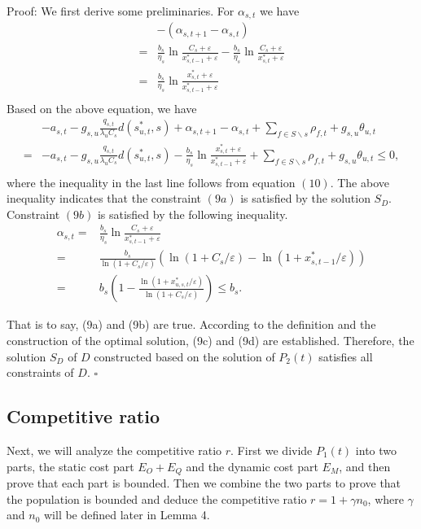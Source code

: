 \documentclass[journal,article,submit,pdftex,moreauthors]{Definitions/mdpi}
\begin{document}
Proof:
We first derive some preliminaries. For $\alpha_{s,t}$ we have\\
\begin{align*}
&-(\alpha_{s,t+1}-\alpha_{s,t})\\
=&\frac{b_s}{\eta_s}\ln \frac{C_s+\varepsilon}{x_{s,t-1}^{*}+\varepsilon}-\frac{b_s}{\eta_s}\ln \frac{C_s+\varepsilon}{x_{s,t}^{*}+\varepsilon}\\
=&\frac{b_s}{\eta_s}\ln \frac{x_{s,t}^{*}+\varepsilon}{x_{s,t-1}^{*}+\varepsilon}\\
\end{align*}
Based on the above equation, we have\\
\begin{align*}
&-a_{s,t}-g_{s,u}\frac{q_{s,t}}{\lambda_u C_s}d(s_{u,t}^{*},s)+\alpha_{s,t+1}-\alpha_{s,t}+\sum_{f \in S\backslash s } \rho_{f,t}+g_{s,u}\theta_{u,t}\\
=&-a_{s,t}-g_{s,u}\frac{q_{s,t}}{\lambda_u C_s}d(s_{u,t}^{*},s)-\frac{b_s}{\eta_s}\ln \frac{x_{s,t}^{*}+\varepsilon}{x_{s,t-1}^{*}+\varepsilon}+\sum_{f\in S \backslash s}\rho_{f,t}+g_{s,u}\theta_{u,t}\le 0,\\
\end{align*}
where the inequality in the last line follows from equation $(10)$. The above inequality indicates that the constraint $(9a)$  is satisfied by the solution $S_D$. Constraint $(9b)$ is satisfied by the following inequality. 
\begin{align*}
\alpha_{s,t}=&\frac{b_s}{\eta_s}\ln \frac{C_s+\varepsilon}{x_{s,t-1}^{*}+\varepsilon}\\
=&\frac{b_s}{\ln (1+C_s / \varepsilon)}(\ln (1+C_s / \varepsilon)- \ln (1+x_{s,t-1}^{*} / \varepsilon))\\
=&b_s(1-\frac{\ln(1+x_{u,s,t}^{*}/ \varepsilon)}{\ln(1+C_s/ \varepsilon)})\le b_s.
\end{align*}

That is to say, (9a)  and (9b) are true.  According to the definition and the construction of the optimal solution, (9c) and (9d) are established.  Therefore, the solution $S_D$ of $D$ constructed based on the solution of $P_2(t)$ satisfies all constraints of $D$. $\square$ 


\subsection{Competitive ratio}

Next, we will analyze the competitive ratio $r$.  First we divide $P_1(t)$ into two parts, the static cost part $E_O+E_Q$ and the dynamic cost part $E_M$, and then prove that each part is bounded. Then we combine the two parts to prove that the population is bounded and deduce the competitive ratio $r=1+\gamma n_0 $, where $\gamma$ and $n_0$ will be defined later in Lemma 4.  
\end{document}
